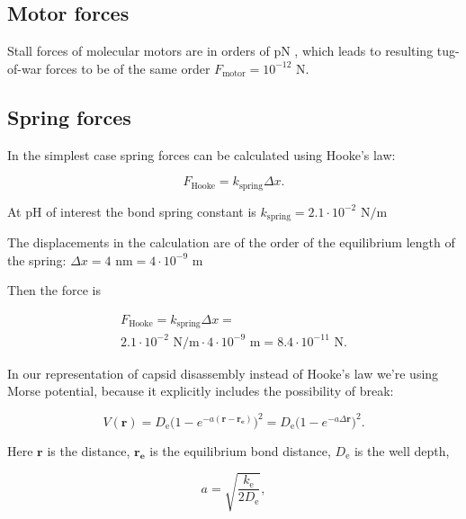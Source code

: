 \subsection{Motor forces}

Stall forces of molecular motors are in orders of pN \cite{muller2008tug}, which leads to resulting tug-of-war forces to be of the same order $F_{\text{motor}} = 10^{-12} \text{ N}$.

\subsection{Spring forces}

In the simplest case spring forces can be calculated using Hooke's law:

\begin{equation}
F_{\text{Hooke}} = k_{\text{spring}}\Delta x.
\end{equation}

At pH of interest the bond spring constant is $k_{\text{spring}} = 2.1 \cdot 10^{-2} \text{ N}/\text{m}$ \cite{li2014ph}

The displacements in the calculation are of the order of the equilibrium length of the spring: $\Delta x = 4 \text{ nm} = 4 \cdot 10^{-9} \text{ m}$

Then the force is

\begin{equation}
\begin{split}
F_{\text{Hooke}} = k_{\text{spring}}\Delta x =\\
2.1 \cdot 10^{-2} \text{ N}/\text{m} \cdot 4 \cdot 10^{-9} \text{ m} = 8.4 \cdot 10^{-11} \text{ N}.
\end{split}
\end{equation}

In our representation of capsid disassembly instead of Hooke's law we're using Morse potential, because it explicitly includes the possibility of break:

\begin{equation}
V(\mathbf{r}) = D_{\text{e}} \big(1 - e^{- a(\mathbf{r - r_e})}\big)^2 = D_{\text{e}} \big(1 - e^{- a \Delta \mathbf{r}}\big)^2.
\end{equation}

Here $\mathbf{r}$ is the distance, $\mathbf{r_e}$ is the equilibrium bond distance, $D_{\text{e}}$ is the well depth,

\begin{equation}
a=\sqrt {\frac{k_{\text{e}}}{2D_{\text{e}}}},
\end{equation}

